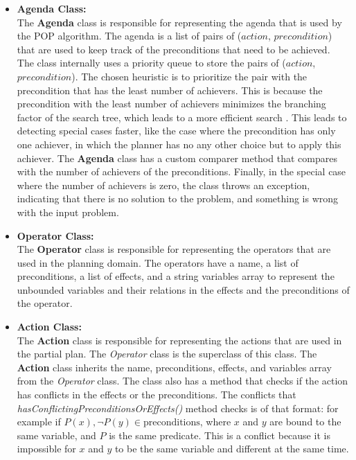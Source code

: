 \begin{itemize}
    \item \textbf{Agenda Class:} \\
          The \textbf{Agenda} class is responsible for representing the agenda that is used by the \ac{POP} algorithm. The agenda is a list of pairs of ($action$, $precondition$) that are used to keep track of the preconditions that need to be achieved. The class internally uses a priority queue to store the pairs of ($action$, $precondition$). The chosen heuristic is to prioritize the pair with the precondition that has the least number of achievers. This is because the precondition with the least number of achievers minimizes the branching factor of the search tree, which leads to a more efficient search \cite{RN2020_Ch.11}. This leads to detecting special cases faster, like the case where the precondition has only one achiever, in which the planner has no any other choice but to apply this achiever. The \textbf{Agenda} class has a custom comparer method that compares with the number of achievers of the preconditions. Finally, in the special case where the number of achievers is zero, the class throws an exception, indicating that there is no solution to the problem, and something is wrong with the input problem.

    \item \textbf{Operator Class:} \\
          The \textbf{Operator} class is responsible for representing the operators that are used in the planning domain. The operators have a name, a list of preconditions, a list of effects, and a string variables array to represent the unbounded variables and their relations in the effects and the preconditions of the operator.

    \item \textbf{Action Class:} \\
          The \textbf{Action} class is responsible for representing the actions that are used in the partial plan. The \textit{Operator} class is the superclass of this class. The \textbf{Action} class inherits the name, preconditions, effects, and variables array from the \textit{Operator} class. The class also has a method that checks if the action has conflicts in the effects or the preconditions. The conflicts that \textit{hasConflictingPreconditionsOrEffects()} method checks is of that format: for example if $P(x), \lnot P(y) \in \text{preconditions}$, where $x$ and $y$ are bound to the same variable, and $P$ is the same predicate. This is a conflict because it is impossible for $x$ and $y$ to be the same variable and different at the same time.


\end{itemize}
